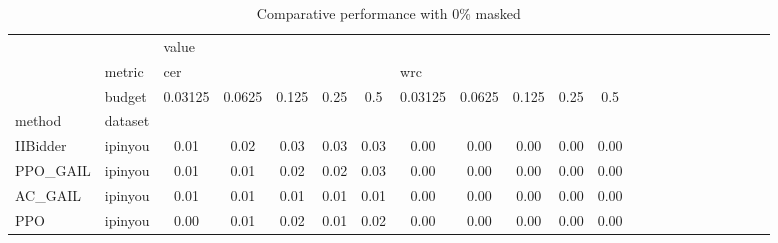 \begin{table}[htbp]
\centering
\caption{Comparative performance with 0\% masked}
\label{mask_0.00}
\begin{tabular}{l|l|cc|cc|cc|cc|cc|cc|cc|cc|cc|cc}
\toprule
    & {} & \multicolumn{10}{l}{value} \\
    & metric & \multicolumn{5}{l}{cer} & \multicolumn{5}{l}{wrc} \\
    & budget & 0.03125 & 0.0625 & 0.125 & 0.25 &  0.5 & 0.03125 & 0.0625 & 0.125 & 0.25 &  0.5 \\
method & dataset &         &        &       &      &      &         &        &       &      &      \\
\midrule
IIBidder & ipinyou &    0.01 &   0.02 &  0.03 & 0.03 & 0.03 &    0.00 &   0.00 &  0.00 & 0.00 & 0.00 \\
PPO\_GAIL & ipinyou &    0.01 &   0.01 &  0.02 & 0.02 & 0.03 &    0.00 &   0.00 &  0.00 & 0.00 & 0.00 \\
AC\_GAIL & ipinyou &    0.01 &   0.01 &  0.01 & 0.01 & 0.01 &    0.00 &   0.00 &  0.00 & 0.00 & 0.00 \\
PPO & ipinyou &    0.00 &   0.01 &  0.02 & 0.01 & 0.02 &    0.00 &   0.00 &  0.00 & 0.00 & 0.00 \\
\bottomrule
\end{tabular}
\end{table}
